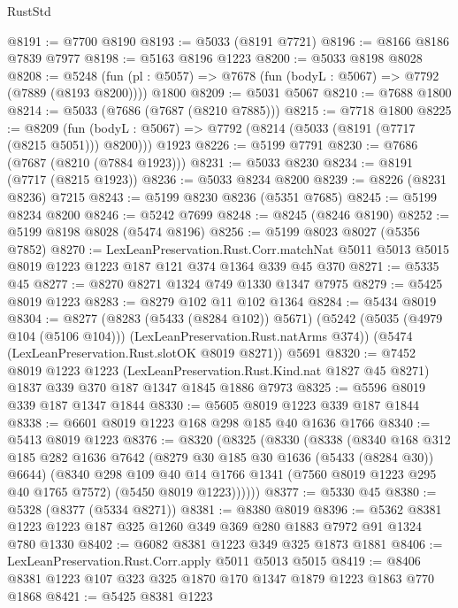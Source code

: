 \begin{lexlean}{RustStd}
\begin{coremodule}
@8191 := @7700 @8190
@8193 := @5033 (@8191 @7721)
@8196 := @8166 @8186 @7839 @7977
@8198 := @5163 @8196 @1223
@8200 := @5033 @8198 @8028
@8208 := @5248
    (fun (pl : @5057) => @7678 (fun (bodyL : @5067) => @7792 (@7889 (@8193 @8200))))
    @1800
@8209 := @5031 @5067
@8210 := @7688 @1800
@8214 := @5033 (@7686 (@7687 (@8210 @7885)))
@8215 := @7718 @1800
@8225 := @8209
    (fun (bodyL : @5067) => @7792 (@8214 (@5033 (@8191 (@7717 (@8215 @5051))) @8200)))
    @1923
@8226 := @5199 @7791
@8230 := @7686 (@7687 (@8210 (@7884 @1923)))
@8231 := @5033 @8230
@8234 := @8191 (@7717 (@8215 @1923))
@8236 := @5033 @8234 @8200
@8239 := @8226 (@8231 @8236) @7215
@8243 := @5199 @8230 @8236 (@5351 @7685)
@8245 := @5199 @8234 @8200
@8246 := @5242 @7699
@8248 := @8245 (@8246 @8190)
@8252 := @5199 @8198 @8028 (@5474 @8196)
@8256 := @5199 @8023 @8027 (@5356 @7852)
@8270 := LexLeanPreservation.Rust.Corr.matchNat
    @5011
    @5013
    @5015
    @8019
    @1223
    @1223
    @187
    @121
    @374
    @1364
    @339
    @45
    @370
@8271 := @5335 @45
@8277 := @8270 @8271 @1324 @749 @1330 @1347 @7975
@8279 := @5425 @8019 @1223
@8283 := @8279 @102 @11 @102 @1364
@8284 := @5434 @8019
@8304 := @8277
    (@8283 (@5433 (@8284 @102)) @5671)
    (@5242 (@5035 (@4979 @104 (@5106 @104))) (LexLeanPreservation.Rust.natArms @374))
    (@5474 (LexLeanPreservation.Rust.slotOK @8019 @8271))
    @5691
@8320 := @7452
    @8019
    @1223
    @1223
    (LexLeanPreservation.Rust.Kind.nat @1827 @45 @8271)
    @1837
    @339
    @370
    @187
    @1347
    @1845
    @1886
    @7973
@8325 := @5596 @8019 @339 @187 @1347 @1844
@8330 := @5605 @8019 @1223 @339 @187 @1844
@8338 := @6601 @8019 @1223 @168 @298 @185 @40 @1636 @1766
@8340 := @5413 @8019 @1223
@8376 := @8320
    (@8325
      (@8330
        (@8338
          (@8340
            @168
            @312
            @185
            @282
            @1636
            @7642
            (@8279 @30 @185 @30 @1636 (@5433 (@8284 @30)) @6644)
            (@8340
              @298
              @109
              @40
              @14
              @1766
              @1341
              (@7560 @8019 @1223 @295 @40 @1765 @7572)
              (@5450 @8019 @1223))))))
@8377 := @5330 @45
@8380 := @5328 (@8377 (@5334 @8271))
@8381 := @8380 @8019
@8396 := @5362 @8381 @1223 @1223 @187 @325 @1260 @349 @369 @280 @1883 @7972 @91 @1324 @780 @1330
@8402 := @6082 @8381 @1223 @349 @325 @1873 @1881
@8406 := LexLeanPreservation.Rust.Corr.apply @5011 @5013 @5015
@8419 := @8406 @8381 @1223 @107 @323 @325 @1870 @170 @1347 @1879 @1223 @1863 @770 @1868
@8421 := @5425 @8381 @1223

\end{coremodule}
\end{lexlean}
